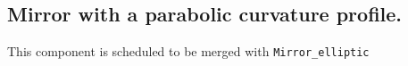 \subsection*{Mirror with a parabolic curvature profile.}

This component is scheduled to be merged with \texttt{Mirror\_elliptic}
